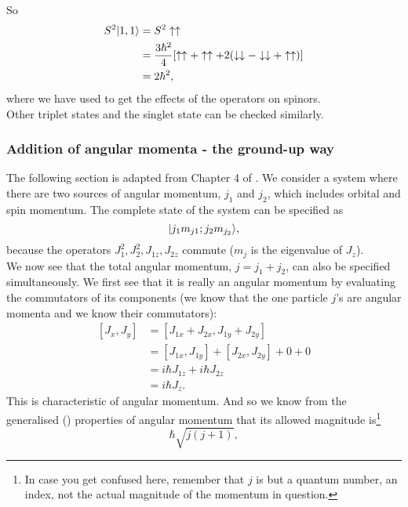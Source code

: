 So 
\begin{equation}
\begin{aligned}
S^2|1,1\rangle&=S^2\uparrow\uparrow\\
&=\frac{3\hbar^2}{4}[\uparrow\uparrow+\uparrow\uparrow+2(\downarrow\downarrow-\downarrow\downarrow+\uparrow\uparrow)]\\
&=2\hbar^2, 
\end{aligned}
\end{equation}
where we have used  to get the effects of the operators on 
spinors. \\
Other triplet states and the singlet state can be checked similarly. 
\subsubsection{Addition of angular momenta - the ground-up way}
\label{angmomcoup}
The following section is adapted from Chapter 4 of \cite{atkinsqm}. We consider a system where there are two sources of angular 
momentum, $j_1$ and $j_2$, which includes orbital and spin momentum. The complete 
state of the system can be specified as 
\begin{equation}
|j_1m_{j1};j_2m_{j_2}\rangle,
\end{equation}
because the operators $J_1^2,J_2^2,J_{1z},J_{2z}$ commute 
($m_j$ is the eigenvalue of $J_z$). \\
We now see that the total angular momentum, $j=j_1+j_2$, 
can also be specified simultaneously. We first see that it is really an angular 
momentum by evaluating the commutators of its components (we know that the one 
particle $j$'s are angular momenta and we know their commutators):
\begin{equation}
\begin{aligned}
[J_x,J_y]&=[J_{1x}+J_{2x},J_{1y}+J_{2y}]\\
&=[J_{1x},J_{1y}]+[J_{2x},J_{2y}]+0+0\\
&=i\hbar J_{1z}+i\hbar J_{2z}\\
&=i\hbar J_z.
\end{aligned}
\end{equation}
This is characteristic of angular momentum. And so we know from the generalised 
() properties of angular momentum that its allowed magnitude is\footnote{In case you get confused here, remember that $j$ is but a quantum number, \ie an index, not the actual magnitude of the momentum in question.}
\begin{equation}
\hbar\sqrt{j(j+1)},
\end{equation}
